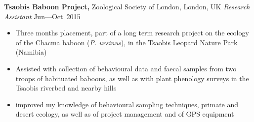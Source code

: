 
\vspace{5pt}

\textbf{Tsaobis Baboon Project,} Zoological Society of London, London, UK \newline
\emph{Research Assistant} \hfill{Jun--–Oct~2015}
\begin{itemize}
  \item Three months placement, part of a long term research project on the ecology of the Chacma baboon (\textit{P. ursinus}), in the Tsaobis Leopard Nature Park (Namibia)
  \item Assisted with collection of behavioural data and faecal samples from two troops of habituated baboons, as well as with plant phenology surveys in the Tsaobis riverbed and nearby hills
  \item improved my knowledge of behavioural sampling techniques, primate and desert ecology, as well as of project management and of GPS equipment
\end{itemize}
